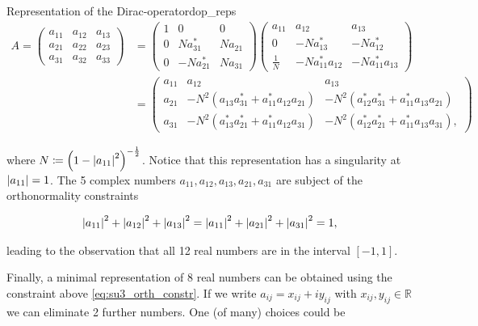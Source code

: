 \documentclass{article}
\theoremstyle{plain} %
\theoremstyle{convention} %
\theoremstyle{remark} %
\numberwithin{equation}{section}
\begin{document}
\begin{proposal}{Representation of the Dirac-operator}{dop_reps}
\begin{align*}
    A =
    \begin{pmatrix}
    a_{11} & a_{12} & a_{13} \\
    a_{21} & a_{22} & a_{23} \\
    a_{31} & a_{32} & a_{33} 
    \end{pmatrix}
    &= 
    \begin{pmatrix}
    1 & 0 & 0 \\
    0 &   N a_{31}^{*} & N a_{21} \\
    0 & - N a_{21}^{*} & N a_{31}
    \end{pmatrix}
    \begin{pmatrix}
    a_{11} & a_{12} & a_{13} \\
    0 & - N a_{13}^{*} & - N a_{12}^{*} \\
    \frac{1}{N} & - N a_{11}^{*} a_{12} & - N a_{11}^{*} a_{13}
    \end{pmatrix} \\
    &= 
    \begin{pmatrix}
    a_{11} & a_{12} & a_{13} \\
    a_{21} & -N^2 \left( a_{13} a_{31}^{*} + a_{11}^{*} a_{12} a_{21} \right) & -N^2 \left( a_{12}^{*} a_{31}^{*} + a_{11}^{*} a_{13} a_{21} \right) \\
    a_{31} & -N^2 \left( a_{13}^{*} a_{21}^{*} + a_{11}^{*} a_{12} a_{31} \right) & -N^2 \left( a_{12}^{*} a_{21}^{*} + a_{11}^{*} a_{13} a_{31} \right),
    \end{pmatrix}
\end{align*}

where $N \coloneqq \left(1 - \abs{a_{11}}^2 \right)^{-\frac{1}{2}}$. Notice that this representation has a singularity at $\abs{a_{11}}=1$. The \num{5} complex numbers $a_{11}, a_{12}, a_{13}, a_{21}, a_{31}$ are subject of the orthonormality constraints

\begin{align}
  \abs{a_{11}}^2 + \abs{a_{12}}^2 + \abs{a_{13}}^2 = \abs{a_{11}}^2 + \abs{a_{21}}^2 + \abs{a_{31}}^2 = 1, \label{eq:su3_orth_constr}
\end{align}

leading to the observation that all \num{12} real numbers are in the interval $[-1, 1].$

Finally, a minimal representation of $8$ real numbers \cite{bunk1986} can be obtained using the constraint above \eqref{eq:su3_orth_constr}. If we write $a_{ij} = x_{ij} + i y_{ij}$ with $x_{ij}, y_{ij} \in \mathbb{R}$ we can eliminate \num{2} further numbers. One (of many) choices could be


\end{proposal}
\end{document}
